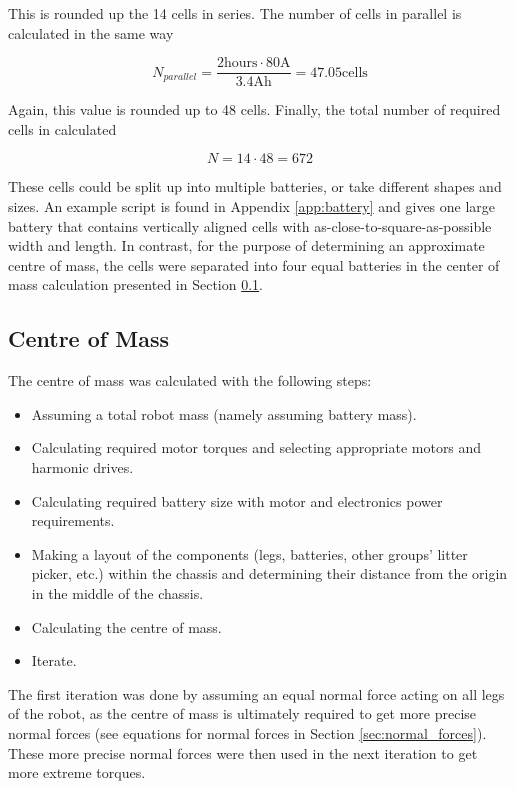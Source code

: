 This is rounded up the 14 cells in series.
The number of cells in parallel is calculated in the same way

\begin{equation}
    N_{parallel} = \frac{2 \text{hours} \cdot 80 \text{A}}{3.4 \text{Ah}} = 47.05 \text{cells}
\end{equation}

Again, this value is rounded up to 48 cells.
Finally, the total number of required cells in calculated

\begin{equation}
    N = 14 \cdot 48 = 672
\end{equation}

These cells could be split up into multiple batteries, or take different shapes and sizes.
An example script is found in Appendix \ref{app:battery} and gives one large battery that contains vertically aligned cells with as-close-to-square-as-possible width and length. In contrast, for the purpose of determining an approximate centre of mass, the cells were separated into four equal batteries in the center of mass calculation presented in
Section \ref{subsec:center_of_mass}.


\subsection{Centre of Mass} \label{subsec:center_of_mass}

The centre of mass was calculated with the following steps:
\begin{itemize}
    \item Assuming a total robot mass (namely assuming battery mass).
    \item Calculating required motor torques and selecting appropriate motors and harmonic drives.
    \item Calculating required battery size with motor and electronics power requirements.
    \item Making a layout of the components (legs, batteries, other groups' litter picker, etc.) within the chassis and determining their distance from the origin in the middle of the chassis.
    \item Calculating the centre of mass.
    \item Iterate.
\end{itemize}

The first iteration was done by assuming an equal normal force acting on all legs of the robot, as the centre of mass is ultimately required to get more precise normal forces (see equations for normal forces in Section \ref{sec:normal_forces}). These more precise normal forces were then used in the next iteration to get more extreme torques. 

